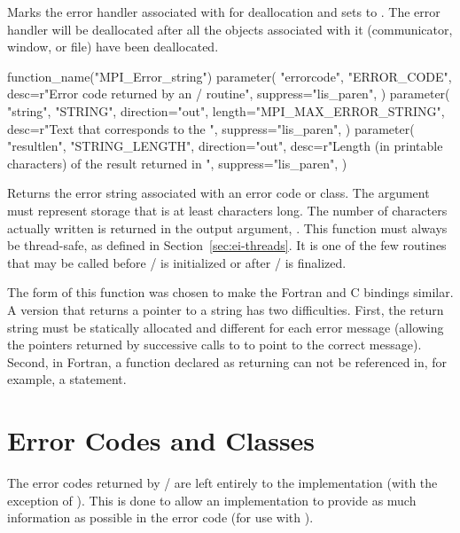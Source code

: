 Marks the error handler associated with  for
deallocation and sets  to
.
The error handler will be deallocated after
all 
the objects
associated with it 
(communicator, window, or file)
have been deallocated.

\begin{mpi-binding}
    function_name("MPI_Error_string")
    parameter(
        "errorcode",
        "ERROR_CODE",
        desc=r"Error code returned by an \MPI/ routine",
        suppress="lis_paren",
    )
    parameter(
        "string",
        "STRING",
        direction="out",
        length="MPI_MAX_ERROR_STRING",
        desc=r"Text that corresponds to the ",
        suppress="lis_paren",
    )
    parameter(
        "resultlen",
        "STRING_LENGTH",
        direction="out",
        desc=r"Length (in printable characters) of the result returned in ",
        suppress="lis_paren",
    )
\end{mpi-binding}

Returns the error string associated with an error code
or class.
The argument  must represent storage that is at least
 characters long.
%
The number of characters actually written
is returned in the output argument, .
%
This function must always be thread-safe, as defined in
Section~\ref{sec:ei-threads}.
It is one of the few routines that may be called before
\MPI/ is initialized or after \MPI/ is finalized.

\begin{rationale}
The form of this function was chosen to make the Fortran and C
bindings similar.  A version that returns a pointer to a string has two
difficulties.  First, the return string must be statically allocated and
different for each error message (allowing the pointers returned by
successive calls to  to point to the correct
message).  Second, in Fortran, a function declared as returning
 can not be referenced in, for example, a
 statement.
\end{rationale}

\section{Error Codes and Classes}
\label{sec:ei-error-classes}
The error codes returned by \MPI/ are left entirely to the
implementation (with the
exception of ).  This is done to allow an implementation to
provide as much information as possible in the error code (for use with
).

